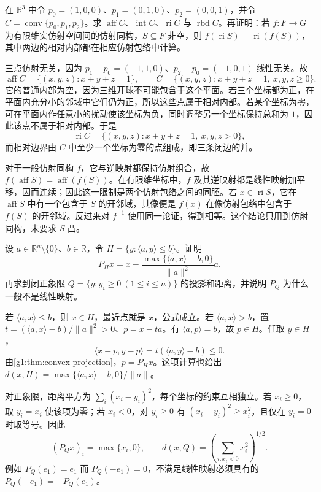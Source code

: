\begin{exercise}\label{g1:ex:relative-triangle}
	在 \(\mathbb R^3\) 中令 \(p_0=(1,0,0)\)、\(p_1=(0,1,0)\)、\(p_2=(0,0,1)\)，并令 \(C=\operatorname{conv}\{p_0,p_1,p_2\}\)。求 \(\operatorname{aff}C\)、\(\operatorname{int}C\)、\(\operatorname{ri}C\) 与 \(\operatorname{rbd}C\)。再证明：若 \(f:F\rightarrow G\) 为有限维实仿射空间间的仿射同构，\(S\subseteq F\) 非空，则 \(f(\operatorname{ri}S)=\operatorname{ri}(f(S))\)，其中两边的相对内部都在相应仿射包络中计算。
\end{exercise}
\begin{solution}
	三点仿射无关，因为 \(p_1-p_0=(-1,1,0)\)、\(p_2-p_0=(-1,0,1)\) 线性无关。故
	\[
		\operatorname{aff}C=\{(x,y,z):x+y+z=1\},\qquad
		C=\{(x,y,z):x+y+z=1,\ x,y,z\geq0\}.
	\]
	它的普通内部为空，因为三维开球不可能包含于这个平面。若三个坐标都为正，在平面内充分小的邻域中它们仍为正，所以这些点属于相对内部。若某个坐标为零，可在平面内作任意小的扰动使该坐标为负，同时调整另一个坐标保持总和为 \(1\)，因此该点不属于相对内部。于是
	\[
		\operatorname{ri}C=\{(x,y,z):x+y+z=1,\ x,y,z>0\},
	\]
	而相对边界由 \(C\) 中至少一个坐标为零的点组成，即三条闭边的并。

	对于一般仿射同构 \(f\)，它与逆映射都保持仿射组合，故 \(f(\operatorname{aff}S)=\operatorname{aff}(f(S))\)。在有限维坐标中，\(f\) 及其逆映射都是线性映射加平移，因而连续；因此这一限制是两个仿射包络之间的同胚。若 \(x\in\operatorname{ri}S\)，它在 \(\operatorname{aff}S\) 中有一个包含于 \(S\) 的开邻域，其像便是 \(f(x)\) 在像仿射包络中包含于 \(f(S)\) 的开邻域。反过来对 \(f^{-1}\) 使用同一论证，得到相等。这个结论只用到仿射同构，未要求 \(S\) 凸。
\end{solution}

\begin{exercise}\label{g1:ex:halfspace-projection}
	设 \(a\in\mathbb R^n\setminus\{0\}\)、\(b\in\mathbb R\)，令 \(H=\{y:\langle a,y\rangle\leq b\}\)。证明
	\[
		P_Hx=x-\frac{\max\{\langle a,x\rangle-b,0\}}{\lVert a\rVert^2}a.
	\]
	再求到闭正象限 \(Q=\{y:y_i\geq0\ (1\leq i\leq n)\}\) 的投影和距离，并说明 \(P_Q\) 为什么一般不是线性映射。
\end{exercise}
\begin{solution}
	若 \(\langle a,x\rangle\leq b\)，则 \(x\in H\)，最近点就是 \(x\)，公式成立。若 \(\langle a,x\rangle>b\)，置 \(t=(\langle a,x\rangle-b)/\lVert a\rVert^2>0\)、\(p=x-ta\)。有 \(\langle a,p\rangle=b\)，故 \(p\in H\)。任取 \(y\in H\)，
	\[
		\langle x-p,y-p\rangle=t(\langle a,y\rangle-b)\leq0.
	\]
	由\cref{g1:thm:convex-projection}，\(p=P_Hx\)。这项计算也给出 \(d(x,H)=\max\{\langle a,x\rangle-b,0\}/\lVert a\rVert\)。

	对正象限，距离平方为 \(\sum_i(x_i-y_i)^2\)，每个坐标的约束互相独立。若 \(x_i\geq0\)，取 \(y_i=x_i\) 使该项为零；若 \(x_i<0\)，对 \(y_i\geq0\) 有 \((x_i-y_i)^2\geq x_i^2\)，且仅在 \(y_i=0\) 时取等号。因此
	\[
		(P_Qx)_i=\max\{x_i,0\},\qquad
		d(x,Q)=\left(\sum_{i:x_i<0}x_i^2\right)^{1/2}.
	\]
	例如 \(P_Q(e_1)=e_1\) 而 \(P_Q(-e_1)=0\)，不满足线性映射必须具有的 \(P_Q(-e_1)=-P_Q(e_1)\)。
\end{solution}

